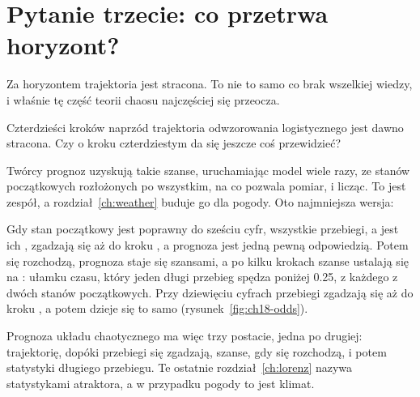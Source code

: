 \section{Pytanie trzecie: co przetrwa horyzont?}
\label{sec:ch18-beyond}

\noindent
Za horyzontem trajektoria jest stracona. To nie to samo co brak wszelkiej
wiedzy, i właśnie tę część teorii chaosu najczęściej się przeocza.

\begin{think}
Czterdzieści kroków naprzód trajektoria odwzorowania logistycznego jest
dawno stracona. Czy o kroku czterdziestym da się jeszcze coś
przewidzieć?
\end{think}
Twórcy prognoz uzyskują takie szanse, uruchamiając model wiele razy, ze stanów
początkowych rozłożonych po wszystkim, na co pozwala pomiar, i licząc. To
jest zespół, a rozdział~\ref{ch:weather} buduje go dla pogody. Oto
najmniejsza wersja:



\noindent
Gdy stan początkowy jest poprawny do sześciu cyfr, wszystkie przebiegi,
a jest ich , zgadzają się aż do kroku
, a prognoza jest jedną pewną odpowiedzią. Potem się
rozchodzą, prognoza staje się szansami, a po kilku krokach szanse ustalają
się na : ułamku czasu, który jeden długi przebieg spędza
poniżej \num{0.25}, z każdego z dwóch stanów początkowych. Przy dziewięciu
cyfrach przebiegi zgadzają się aż do kroku , a
potem dzieje się to samo (rysunek~\ref{fig:ch18-odds}).


Prognoza układu chaotycznego ma więc trzy postacie, jedna po drugiej:
trajektorię, dopóki przebiegi się zgadzają, szanse, gdy się rozchodzą, i
potem statystyki długiego przebiegu. Te ostatnie rozdział~\ref{ch:lorenz}
nazywa statystykami atraktora, a w przypadku pogody to jest klimat.


